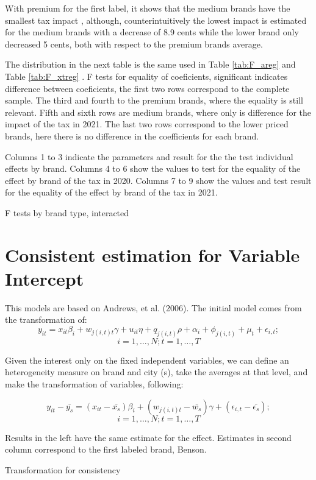 \documentclass[]{article}
\begin{document}
With premium for the first label, it shows that the medium brands have the smallest tax impact , although, counterintuitively the lowest impact is estimated for the medium brands with a decrease of 8.9 cents while the lower brand only decreased 5 cents, both with respect to the premium brands average. 

The distribution in the next table is the same used in Table \ref{tab:F_areg} and Table \ref{tab:F_xtreg} . F tests for equality of coeficients, significant indicates difference between coeficients, the first two rows correspond to the complete sample. The third and fourth to the premium brands, where the equality is still relevant. Fifth and sixth rows are medium brands, where only is difference for the impact of the tax in 2021. The last two rows correspond to the lower priced brands, here there is no difference in the coefficients for each brand.

Columns 1 to 3 indicate the parameters and result for the the test individual effects by brand. Columns 4 to 6 show the values to test for the equality of the effect by brand of the tax in 2020. Columns 7 to 9 show the values and test result for the equality of the effect by brand of the tax in 2021.
 
\begin{landscape}
\begin{table}[ht]
	\centering
	\caption{F tests by brand type, interacted \label{tab:F_tests_dyn}} 
	
\end{table}
\end{landscape}
 
\section{Consistent estimation for Variable Intercept}
This models are based on Andrews, et al. (2006). The initial model comes from the transformation of:
\begin{equation*}
	y_{it} = x_{it} \beta_{i} + w_{j(i,t)t} \gamma + u_{it} \eta + q_{j(i,t)} \rho + \alpha_{i}  + \phi_{j(i,t)} + \mu_{t} + \epsilon_{i,t}; 
\end{equation*}
$$i = 1,\ldots,N; t=1,\ldots,T$$

Given the interest only on the fixed independent variables, we can define an heterogeneity measure on brand and city (s), take the averages at that level, and make the transformation of variables, following:
 
\begin{equation*}
y_{it} - \bar{y_s} = (x_{it} - \bar{x_{s}}) \beta_{i} + (w_{j(i,t)t}-\bar{w_{s}}) \gamma + (\epsilon_{i,t} - \bar{\epsilon_{s}}); 
\end{equation*}
$$i = 1,\ldots,N; t=1,\ldots,T$$
 
Results in the left have the same estimate for the effect. Estimates in second column correspond to the first labeled brand, Benson.
 
	\begin{table}[ht]
		\centering
		\caption{Transformation for consistency \label{tab:xt_dm}} 

	\end{table}
\end{document}

